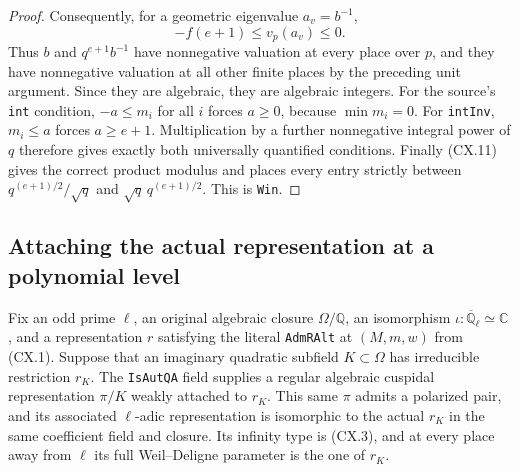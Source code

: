 \begin{proof}
Consequently, for a geometric eigenvalue $a_v=b^{-1}$,
\[
             -f(e+1)\le v_p(a_v)\le0.
                                                               \tag{CX.13}
\]
Thus $b$ and $q^{e+1}b^{-1}$ have nonnegative valuation at
every place over $p$, and they have nonnegative valuation at
all other finite places by the preceding unit argument.
Since they are algebraic, they are algebraic integers.
For the source's \texttt{int} condition, $-a\le m_i$ for all
$i$ forces $a\ge0$, because $\min m_i=0$.  For
\texttt{intInv}, $m_i\le a$ forces $a\ge e+1$.
Multiplication by a further nonnegative integral power of $q$
therefore gives exactly both universally quantified conditions.
Finally (CX.11) gives the correct product modulus and places
every entry strictly between $q^{(e+1)/2}/\sqrt q$ and
$\sqrt q\,q^{(e+1)/2}$.  This is \texttt{Win}.
\end{proof}
\subsection{Attaching the actual representation at a polynomial level}

\begin{proposition}
\label{claim:CX4}
Fix an odd prime $\ell$, an original algebraic closure
$\Omega/\mathbb Q$, an isomorphism
$\iota:\overline{\mathbb Q}_\ell\simeq\mathbb C$, and a
representation $r$ satisfying the literal
\texttt{AdmRAlt} at $(M,m,w)$ from (CX.1).  Suppose that an
imaginary quadratic subfield $K\subset\Omega$ has irreducible
restriction $r_K$.  The \texttt{IsAutQA} field supplies a
regular algebraic cuspidal representation $\pi/K$ weakly
attached to $r_K$.  This same $\pi$ admits a polarized pair,
and its associated $\ell$-adic representation is isomorphic to
the actual $r_K$ in the same coefficient field and closure.
Its infinity type is (CX.3), and at every place away from
$\ell$ its full Weil--Deligne parameter is the one of $r_K$.
\end{proposition}

